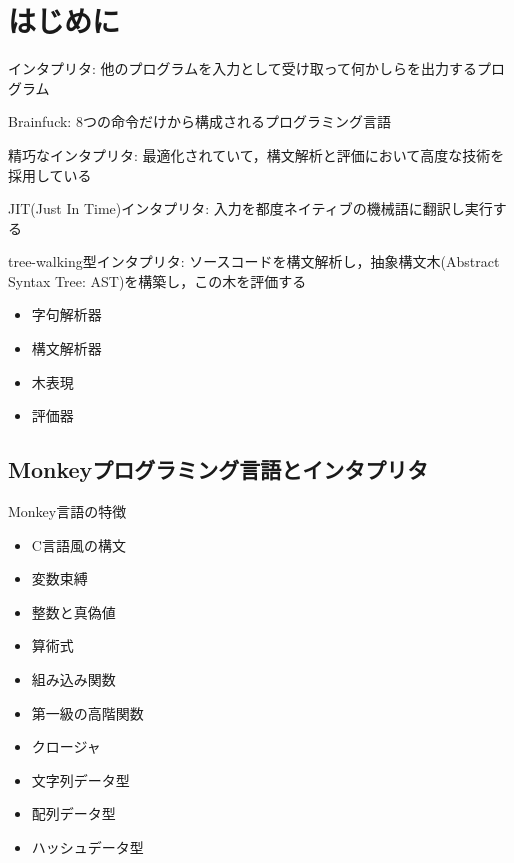 \section{はじめに}

インタプリタ: 他のプログラムを入力として受け取って何かしらを出力するプログラム

Brainfuck: 8つの命令だけから構成されるプログラミング言語

精巧なインタプリタ: 最適化されていて，構文解析と評価において高度な技術を採用している

JIT(Just In Time)インタプリタ: 入力を都度ネイティブの機械語に翻訳し実行する

tree-walking型インタプリタ: ソースコードを構文解析し，抽象構文木(Abstract Syntax Tree: AST)を構築し，この木を評価する

\begin{itemize}
  \item 字句解析器
  \item 構文解析器
  \item 木表現
  \item 評価器
\end{itemize}

\subsection{Monkeyプログラミング言語とインタプリタ}

Monkey言語の特徴

\begin{itemize}
  \item C言語風の構文
  \item 変数束縛
  \item 整数と真偽値
  \item 算術式
  \item 組み込み関数
  \item 第一級の高階関数
  \item クロージャ
  \item 文字列データ型
  \item 配列データ型
  \item ハッシュデータ型
\end{itemize}
